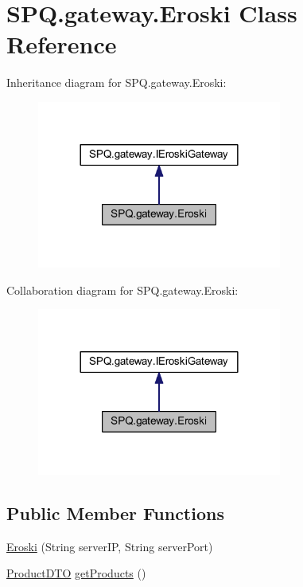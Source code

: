 \hypertarget{class_s_p_q_1_1gateway_1_1_eroski}{}\section{S\+P\+Q.\+gateway.\+Eroski Class Reference}
\label{class_s_p_q_1_1gateway_1_1_eroski}


Inheritance diagram for S\+P\+Q.\+gateway.\+Eroski\+:\nopagebreak
\begin{figure}[H]
\begin{center}
\leavevmode
\includegraphics[width=228pt]{class_s_p_q_1_1gateway_1_1_eroski__inherit__graph}
\end{center}
\end{figure}


Collaboration diagram for S\+P\+Q.\+gateway.\+Eroski\+:\nopagebreak
\begin{figure}[H]
\begin{center}
\leavevmode
\includegraphics[width=228pt]{class_s_p_q_1_1gateway_1_1_eroski__coll__graph}
\end{center}
\end{figure}
\subsection*{Public Member Functions}
\begin{DoxyCompactItemize}
\item 
\mbox{\hyperlink{class_s_p_q_1_1gateway_1_1_eroski_a3cc7f464fb202689cf62501ffb5ede18}{Eroski}} (String server\+IP, String server\+Port)
\item 
\mbox{\hyperlink{class_s_p_q_1_1dto_1_1_product_d_t_o}{Product\+D\+TO}} \mbox{\hyperlink{class_s_p_q_1_1gateway_1_1_eroski_acfd174565206c16fb55489786957b8de}{get\+Products}} ()
\end{DoxyCompactItemize}


